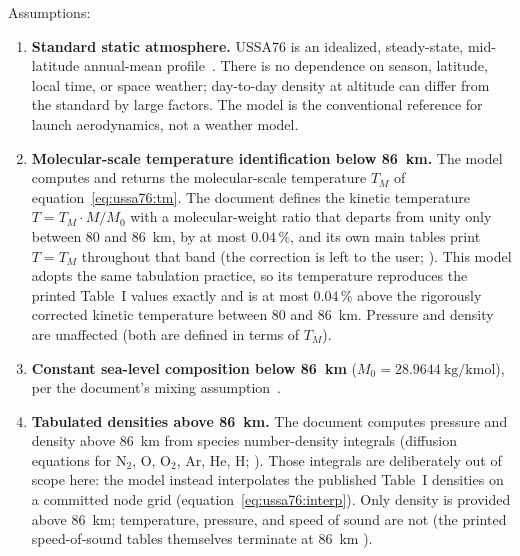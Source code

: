 Assumptions:
\begin{enumerate}
  \item \textbf{Standard static atmosphere.} USSA76 is an idealized,
    steady-state, mid-latitude annual-mean profile~\cite{ussa1976}. There
    is no dependence on season, latitude, local time, or space weather;
    day-to-day density at altitude can differ from the standard by large
    factors. The model is the conventional reference for launch
    aerodynamics, not a weather model.
  \item \textbf{Molecular-scale temperature identification below
    \qty{86}{\kilo\metre}.} The model computes and returns the
    molecular-scale temperature $T_M$ of equation~\eqref{eq:ussa76:tm}.
    The document defines the kinetic temperature $T = T_M \cdot M/M_0$
    with a molecular-weight ratio that departs from unity only between 80
    and \qty{86}{\kilo\metre}, by at most $0.04\,\%$, and its own main
    tables print $T = T_M$ throughout that band (the correction is left
    to the user; \cite[Part~1, \S1.2.4, p.~9]{ussa1976}). This model
    adopts the same tabulation practice, so its temperature reproduces
    the printed Table~I values exactly and is at most $0.04\,\%$ above
    the rigorously corrected kinetic temperature between 80 and
    \qty{86}{\kilo\metre}. Pressure and density are unaffected (both are
    defined in terms of $T_M$).
  \item \textbf{Constant sea-level composition below
    \qty{86}{\kilo\metre}} ($M_0 = \qty{28.9644}{\kilogram\per\kilo\mole}$),
    per the document's mixing assumption~\cite[Part~1, \S1.2.4]{ussa1976}.
  \item \textbf{Tabulated densities above \qty{86}{\kilo\metre}.} The
    document computes pressure and density above \qty{86}{\kilo\metre}
    from species number-density integrals (diffusion equations for
    N$_2$, O, O$_2$, Ar, He, H; \cite[Part~1, \S1.3.1,
    eq.~33c]{ussa1976}). Those integrals are deliberately out of scope
    here: the model instead interpolates the published Table~I densities
    on a committed node grid (equation~\eqref{eq:ussa76:interp}). Only
    density is provided above \qty{86}{\kilo\metre}; temperature,
    pressure, and speed of sound are not (the printed speed-of-sound
    tables themselves terminate at \qty{86}{\kilo\metre}
    \cite[Part~1, \S1.3.10]{ussa1976}).
\end{enumerate}

